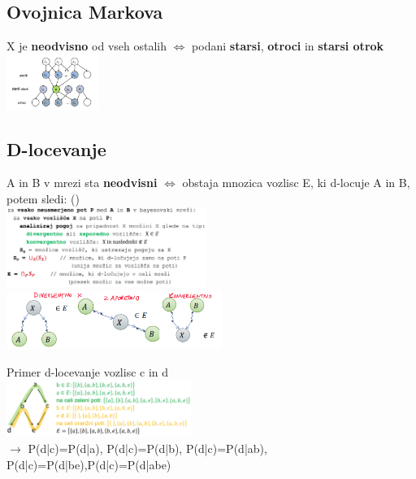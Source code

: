 \subsection{Ovojnica Markova}
X je \textbf{neodvisno} od vseh ostalih $\Leftrightarrow$ podani \textbf{starsi}, \textbf{otroci} in \textbf{starsi otrok}\\
\includegraphics[width=3cm]{images/ovojnica-markova.png}

\subsection{D-locevanje}

A in B v mrezi sta \textbf{neodvisni} $\Leftrightarrow$ obstaja mnozica vozlisc E, ki d-locuje A in B, potem sledi:  ()\\
\includegraphics[width=6.5cm]{images/d-locevanje-algoritem.png}
\includegraphics*[width=7cm]{images/d-locevanje-nacini.png}

Primer d-locevanje vozlisc c in d\\
\includegraphics*[width=6cm]{images/primer-d-locevanje.png}\\
$\rightarrow$ P(d|c)=P(d|a), P(d|c)=P(d|b), P(d|c)=P(d|ab),\\
P(d|c)=P(d|be),P(d|c)=P(d|abe)
